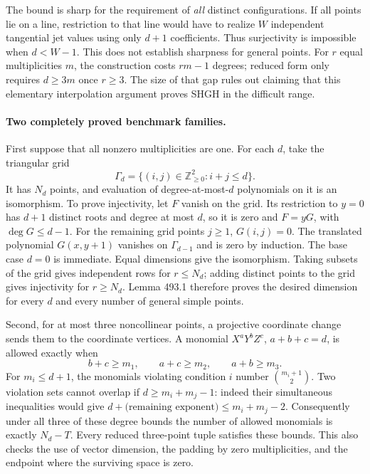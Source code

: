 \documentclass[11pt]{article}
\begin{document}
The bound is sharp for the requirement of \emph{all} distinct configurations.
If all points lie on a line, restriction to that line would have to realize
$W$ independent tangential jet values using only $d+1$ coefficients. Thus
surjectivity is impossible when $d<W-1$. This does not establish sharpness
for general points. For $r$ equal multiplicities $m$, the construction costs
$rm-1$ degrees; reduced form only requires $d\geq3m$ once $r\geq3$.
The size of that gap rules out claiming that this elementary interpolation
argument proves SHGH in the difficult range.

\paragraph{Two completely proved benchmark families.}
First suppose that all nonzero multiplicities are one. For each $d$, take
the triangular grid
\[
                 \Gamma_d=\{(i,j)\in\mathbb Z_{\geq0}^2:i+j\leq d\}.
\]
It has $N_d$ points, and evaluation of degree-at-most-$d$ polynomials on
it is an isomorphism. To prove injectivity, let $F$ vanish on the grid.
Its restriction to $y=0$ has $d+1$ distinct roots and degree at most $d$,
so it is zero and $F=yG$, with $\deg G\leq d-1$. For the remaining
grid points $j\geq1$, $G(i,j)=0$. The translated polynomial
$G(x,y+1)$ vanishes on $\Gamma_{d-1}$ and is zero by induction. The
base case $d=0$ is immediate. Equal dimensions give the isomorphism.
Taking subsets of the grid gives independent rows for $r\leq N_d$;
adding distinct points to the grid gives injectivity for $r\geq N_d$.
Lemma 493.1 therefore proves the desired dimension for every $d$ and every
number of general simple points.

Second, for at most three noncollinear points, a projective coordinate
change sends them to the coordinate vertices. A monomial $X^aY^bZ^c$,
$a+b+c=d$, is allowed exactly when
\[
                 b+c\geq m_1,\qquad a+c\geq m_2,
                 \qquad a+b\geq m_3.
\]
For $m_i\leq d+1$, the monomials violating condition $i$ number
$\binom{m_i+1}{2}$. Two violation sets cannot overlap if
$d\geq m_i+m_j-1$: indeed their simultaneous inequalities would give
$d+\text{(remaining exponent)}\leq m_i+m_j-2$. Consequently under
all three of these degree bounds the number of allowed monomials is exactly
$N_d-T$. Every reduced three-point tuple satisfies these bounds. This also
checks the use of vector dimension, the padding by zero multiplicities,
and the endpoint where the surviving space is zero.
\end{document}
